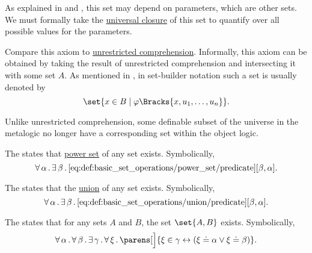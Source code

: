 \begin{definition}
\begin{thmenum}
    As explained in  and , this set may depend on parameters, which are other sets. We must formally take the \hyperref[thm:implicit_universal_quantification]{universal closure} of this set to quantify over all possible values for the parameters.

    Compare this axiom to \hyperref[def:naive_set_theory/unrestricted_comprehension]{unrestricted comprehension}. Informally, this axiom can be obtained by taking the result of unrestricted comprehension and intersecting it with some set \( A \). As mentioned in , in set-builder notation such a set is usually denoted by
    \begin{equation*}
      \set{ x \in B \given \varphi\Bracks{x, u_1, \ldots, u_n} }.
    \end{equation*}

    Unlike unrestricted comprehension, some definable subset of the universe in the metalogic no longer have a corresponding set within the object logic.

     The  states that \hyperref[def:basic_set_operations/power_set]{power set} of any set exists. Symbolically,
    \begin{equation}\label{eq:def:zfc/power_set}
      \forall \thinspace \alpha \thinspace . \thinspace \exists \thinspace \beta \thinspace . \thinspace \ref{eq:def:basic_set_operations/power_set/predicate}[\beta, \alpha].
    \end{equation}

     The  states that the \hyperref[def:basic_set_operations/union]{union} of any set exists. Symbolically,
    \begin{equation}\label{eq:def:zfc/union}
      \forall \thinspace \alpha \thinspace . \thinspace \exists \thinspace \beta \thinspace . \thinspace \ref{eq:def:basic_set_operations/union/predicate}[\beta, \alpha].
    \end{equation}

     The  states that for any sets \( A \) and \( B \), the set \( \set{ A, B } \) exists. Symbolically,
    \begin{equation}\label{eq:def:zfc/pairing}
      \qforall \alpha \qforall \beta \qexists \gamma \qforall \xi \parens[\Big]{ \xi \in \gamma \leftrightarrow ( \xi \doteq \alpha \vee \xi \doteq \beta) }.
    \end{equation}


\end{thmenum}
\end{definition}

